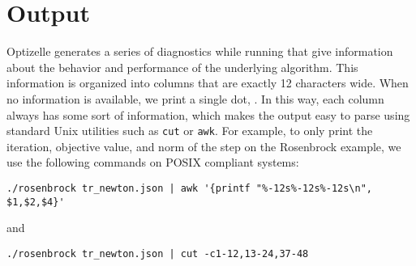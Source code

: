 \documentclass{report}
\makeatletter
\DeclareRobustCommand*{\textct}[1]{%
  \begingroup\@activeus\scantokens{\texttt{#1}\endinput}\endgroup}
\newcommand{\choutput}{Output}
\makeatother
\begin{document}
\chapter{\choutput}\label{ch:output}

        Optizelle generates a series of diagnostics while running that give information about the behavior and performance of the underlying algorithm.  This information is organized into columns that are exactly 12 characters wide.  When no information is available, we print a single dot, \textct{.}.  In this way, each column always has some sort of information, which makes the output easy to parse using standard Unix utilities such as \texttt{cut} or \texttt{awk}.  For example, to only print the iteration, objective value, and norm of the step on the Rosenbrock example, we use the following commands on POSIX compliant systems:
\begin{center}\begin{verbatim}
./rosenbrock tr_newton.json | awk '{printf "%-12s%-12s%-12s\n", $1,$2,$4}'
\end{verbatim}
\end{center}
\noindent and
\begin{center}\begin{verbatim}
./rosenbrock tr_newton.json | cut -c1-12,13-24,37-48
\end{verbatim}
\end{center}
        
\end{document}
